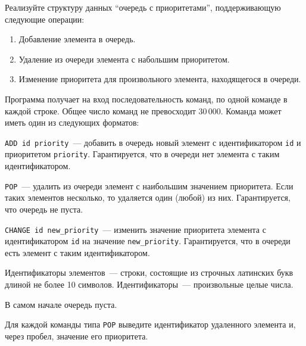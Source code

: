 Реализуйте структуру данных ``очередь с приоритетами'', поддерживающую
следующие операции:

\begin{enumerate}
\item Добавление элемента в очередь.
\item Удаление из очереди элемента с набольшим приоритетом.
\item Изменение приоритета для произвольного элемента, находящегося в
очереди.
\end{enumerate}

\InputFile
Программа получает на вход последовательность команд, по одной команде
в каждой строке. Общее число команд не превосходит
$30\,000$. Команда может иметь один из следующих форматов:

\verb"ADD id priority"~--- добавить в очередь новый элемент
с идентификатором \verb"id" и приоритетом \verb"priority".
Гарантируется, что в очереди нет элемента с таким идентификатором.

\verb"POP"~--- удалить из очереди элемент с наибольшим значением
приоритета. Если таких элементов несколько, то удаляется один
(любой) из них. Гарантируется, что очередь не пуста.

\verb"CHANGE id new_priority"~--- изменить значение приоритета
элемента с идентификатором \verb"id" на значение \verb"new_priority".
Гарантируется, что в очереди есть элемент с таким идентификатором.

Идентификаторы элементов~--- строки, состоящие из строчных латинских
букв длиной не более 10 символов. Идентификаторы~--- произвольные
целые числа.

В самом начале очередь пуста.

\OutputFile
Для каждой команды типа \verb"POP" выведите
идентификатор удаленного элемента и, через пробел,
значение его приоритета.

